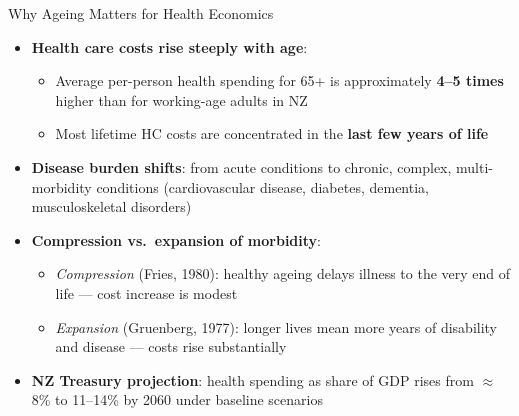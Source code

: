 \documentclass[aspectratio=169, 12pt]{beamer}
\begin{document}
\begin{frame}{Why Ageing Matters for Health Economics}
  \begin{itemize}
    \item \textbf{Health care costs rise steeply with age}:
    \begin{itemize}
      \item Average per-person health spending for 65+ is approximately \textbf{4--5 times}
            higher than for working-age adults in NZ
      \item Most lifetime HC costs are concentrated in the \textbf{last few years of life}
    \end{itemize}
    \item \textbf{Disease burden shifts}: from acute conditions to chronic, complex,
          multi-morbidity conditions (cardiovascular disease, diabetes, dementia,
          musculoskeletal disorders)
    \item \textbf{Compression vs.\ expansion of morbidity}:
    \begin{itemize}
      \item \textit{Compression} (Fries, 1980): healthy ageing delays illness to the very
            end of life --- cost increase is modest
      \item \textit{Expansion} (Gruenberg, 1977): longer lives mean more years of disability
            and disease --- costs rise substantially
    \end{itemize}
    \item \textbf{NZ Treasury projection}: health spending as share of GDP rises from
          $\approx$8\% to 11--14\% by 2060 under baseline scenarios
  \end{itemize}
\end{frame}
\end{document}
